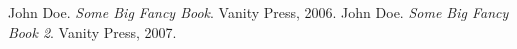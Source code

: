 \begin{thebibliography}{0}



















John Doe. \emph{Some Big Fancy Book}. Vanity Press, 2006.
John Doe. \emph{Some Big Fancy Book 2}. Vanity Press, 2007.

\end{thebibliography}




